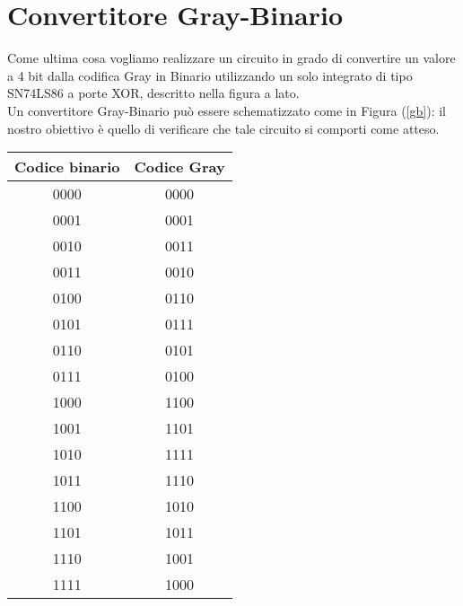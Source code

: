 \documentclass[10pt, a4paper, italian]{article}
\begin{document}
\section{Convertitore Gray-Binario}
\begin{minipage}{0.7\textwidth}
    Come ultima cosa vogliamo realizzare un circuito in grado di convertire un valore a 4 bit dalla codifica Gray in Binario utilizzando un solo integrato di tipo SN74LS86 a porte XOR, descritto nella figura a lato.\\
    Un convertitore Gray-Binario può essere schematizzato come in Figura (\ref{gb}): il nostro obiettivo è quello di verificare che tale circuito si comporti come atteso.
\end{minipage}
\begin{minipage}{0.3\textwidth}
\end{minipage}
\newline
\begin{minipage}{0.5\textwidth}
    \centering
    \label{gb}
\end{minipage}
\begin{minipage}{0.5\textwidth}
    \centering
    \begin{tabular}{c||c}
        Codice binario & Codice Gray \\
        \hline
        \hline
        0000 & 0000\\
        0001 & 0001\\
        0010 & 0011\\
        0011 & 0010\\
        0100 & 0110\\
        0101 & 0111\\
        0110 & 0101\\
        0111 & 0100\\
        1000 & 1100\\
        1001 & 1101\\
        1010 & 1111\\
        1011 & 1110\\
        1100 & 1010\\
        1101 & 1011\\
        1110 & 1001\\
        1111 & 1000\\
        \end{tabular}
    \label{grbin}
\end{minipage}
\end{document}
